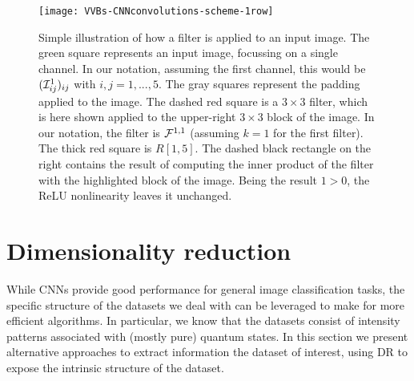 \begin{figure}[tb]
    \centering
    \texttt{[image: VVBs-CNNconvolutions-scheme-1row]}
    \caption{
    	Simple illustration of how a filter is applied to an input image.
    	The green square represents an input image, focussing on a single channel. In our notation, assuming the first channel, this would be $({\mathcal{I}}^1_{ij})_{ij}$ with $i,j=1,...,5$.
    	The gray squares represent the padding applied to the image.
    	The dashed red square is a $3\times 3$ filter, which is here shown applied to the upper-right $3\times3$ block of the image.
    	In our notation, the filter is ${\mathcal{F}}^{1,1}$ (assuming $k=1$ for the first filter). The thick red square is $R[1,5]$. The dashed black rectangle on the right contains the result of computing the inner product of the filter with the highlighted block of the image.
    	Being the result $1>0$, the ReLU nonlinearity leaves it unchanged.
    }%
    \label{fig:VVBs:convolutions_example}
\end{figure}


\section{Dimensionality reduction}
\label{sec:VVBs:dimensionality_reduction}

While CNNs provide good performance for general image classification tasks, the specific structure of the datasets we deal with can be leveraged to make for more efficient algorithms. In particular, we know that the datasets consist of intensity patterns associated with (mostly pure) quantum states.
In this section we present alternative approaches to extract information the dataset of interest, using \ac{DR} to expose the intrinsic structure of the dataset.


